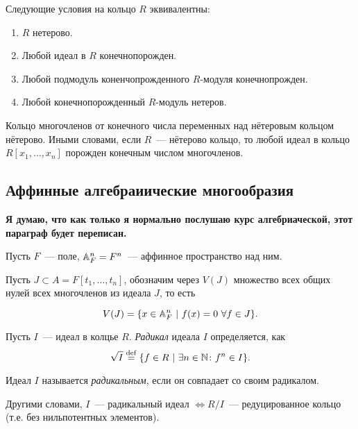 \begin{lemma} 
	Следующие условия на кольцо $R$ эквивалентны:
	\begin{enumerate}
		\item $R$ нетерово. 

		\item Любой идеал в $R$ конечнопорожден. 

		\item Любой подмодуль коненчопрожденного $R$-модуля конечнопрожден. 

		\item Любой конечнопорожденный $R$-модуль нетеров. 
	\end{enumerate}
\end{lemma}

\begin{theorem}
	Кольцо многочленов от конечного числа переменных над нётеровым кольцом нётерово. 
	Иными словами, если $R$~--- нётерово кольцо, то любой идеал в кольцо $R[x_{1}, \ldots, x_{n}]$ порожден конечным числом многочленов. 
\end{theorem}


\subsection{Аффинные алгебраиические многообразия}

\bf{Я думаю, что как только я нормально послушаю курс алгебриаческой, этот параграф будет переписан. }

Пусть $F$~--- поле, $\AA^{n}_{F} = F^n$~--- аффинное пространство над ним. 

Пусть $J \subset A = F[t_{1}, \ldots, t_{n}]$, обозначим через $V(J)$ множество всех общих нулей всех многочленов из идеала $J$, 
то есть 

\[
	V(J) = \{ x \in \AA^{n}_{F} \ \vert \ f(x) = 0 \ \forall f \in J \}. 
\]

\begin{definition} 
	Пусть $I$~--- идеал в колцье $R$. \emph{Радикал} идеала $I$ определяется, как 
	\[
		\sqrt{I} \eqdef \{ f \in R \ \vert \ \exists n \in \N \colon f^n \in I \}.
	\]

	Идеал $I$ называется \emph{радикальным}, если он совпадает со своим радикалом. 
\end{definition}

\begin{remark}
	Другими словами, $I$~--- радикальный идеал $\Leftrightarrow R/I$~--- редуцированное кольцо (т.е. без нильпотентных элементов). 
\end{remark}

